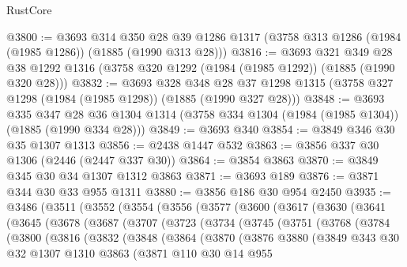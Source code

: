 \begin{lexlean}{RustCore}
\begin{coremodule}
@3800 := @3693
    @314
    @350
    @28
    @39
    @1286
    @1317
    (@3758 @313 @1286 (@1984 (@1985 @1286)) (@1885 (@1990 @313 @28)))
@3816 := @3693
    @321
    @349
    @28
    @38
    @1292
    @1316
    (@3758 @320 @1292 (@1984 (@1985 @1292)) (@1885 (@1990 @320 @28)))
@3832 := @3693
    @328
    @348
    @28
    @37
    @1298
    @1315
    (@3758 @327 @1298 (@1984 (@1985 @1298)) (@1885 (@1990 @327 @28)))
@3848 := @3693
    @335
    @347
    @28
    @36
    @1304
    @1314
    (@3758 @334 @1304 (@1984 (@1985 @1304)) (@1885 (@1990 @334 @28)))
@3849 := @3693 @340
@3854 := @3849 @346 @30 @35 @1307 @1313
@3856 := @2438 @1447 @532
@3863 := @3856 @337 @30 @1306 (@2446 (@2447 @337 @30))
@3864 := @3854 @3863
@3870 := @3849 @345 @30 @34 @1307 @1312 @3863
@3871 := @3693 @189
@3876 := @3871 @344 @30 @33 @955 @1311
@3880 := @3856 @186 @30 @954 @2450
@3935 := @3486
    (@3511
      (@3552
        (@3554
          (@3556
            (@3577
              (@3600
                (@3617
                  (@3630
                    (@3641
                      (@3645
                        (@3678
                          (@3687
                            (@3707
                              (@3723
                                (@3734
                                  (@3745
                                    (@3751
                                      (@3768
                                        (@3784
                                          (@3800
                                            (@3816
                                              (@3832
                                                (@3848
                                                  (@3864
                                                    (@3870
                                                      (@3876
                                                        @3880
                                                        (@3849
                                                          @343
                                                          @30
                                                          @32
                                                          @1307
                                                          @1310
                                                          @3863
                                                          (@3871
                                                            @110
                                                            @30
                                                            @14
                                                            @955

\end{coremodule}
\end{lexlean}
